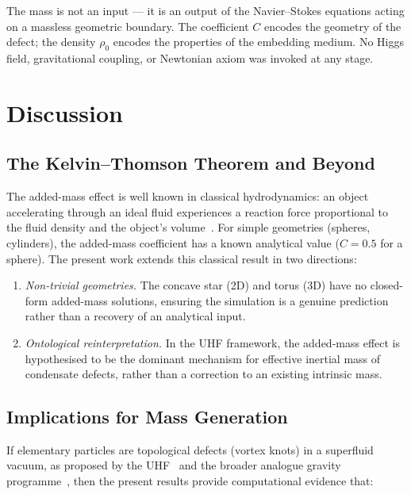 \documentclass[reprint,amsmath,amssymb,aps,pre,floatfix]{revtex4-2}
\begin{document}
The mass is not an input --- it is an output of the Navier--Stokes
equations acting on a massless geometric boundary.  The coefficient $C$
encodes the geometry of the defect; the density $\rho_0$ encodes the
properties of the embedding medium.  No Higgs field, gravitational
coupling, or Newtonian axiom was invoked at any stage.

\section{Discussion}
\label{sec:discussion}

\subsection{The Kelvin--Thomson Theorem and Beyond}
\label{sec:kt}

The added-mass effect is well known in classical hydrodynamics: an object
accelerating through an ideal fluid experiences a reaction force
proportional to the fluid density and the object's
volume~\cite{Kelvin1868,Lamb1932}.  For simple geometries (spheres,
cylinders), the added-mass coefficient has a known analytical value
($C=0.5$ for a sphere).  The present work extends this classical result in
two directions:

\begin{enumerate}
\item \emph{Non-trivial geometries.}  The concave star (2D) and torus (3D)
  have no closed-form added-mass solutions, ensuring the simulation is a
  genuine prediction rather than a recovery of an analytical input.
\item \emph{Ontological reinterpretation.}  In the UHF framework, the
  added-mass effect is hypothesised to be the dominant mechanism for
  effective inertial mass of condensate defects, rather than a
  correction to an existing intrinsic mass.
\end{enumerate}

\subsection{Implications for Mass Generation}
\label{sec:implications}

If elementary particles are topological defects (vortex knots) in a
superfluid vacuum, as proposed by the UHF~\cite{Amit2026} and the broader
analogue gravity programme~\cite{Unruh1981,Volovik2003}, then the present
results provide computational evidence that:
\end{document}
